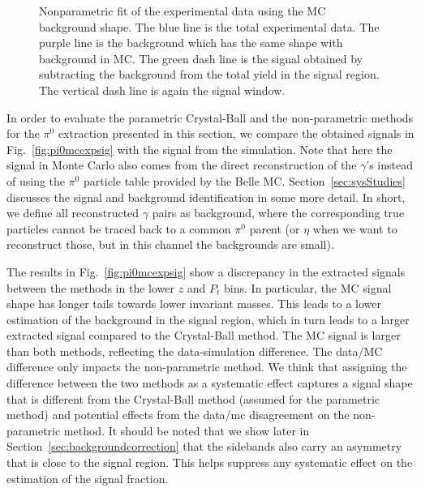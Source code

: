 \begin{figure}
  \caption[Nonparametric fit of the experimental data using the Monte Carlo background shape]{Nonparametric fit of the experimental data using the MC background shape. The blue line is the total experimental data. The purple line is the background which has the same shape with background in MC. The green dash line is the signal obtained by subtracting the background from the total yield in the signal region. The vertical dash line is again the signal window. }
  \label{fig:pi0_fit}
\end{figure}

In order to evaluate the parametric Crystal-Ball and the non-parametric methods for the $\pi^0$ extraction presented in this section, we compare the obtained signals in Fig.~\ref{fig:pi0mcexpsig} with the signal from the simulation. 
Note that here the signal in Monte Carlo also comes from the direct reconstruction of the $\gamma$'s instead of using the $\pi^0$ particle table provided by the Belle MC. Section~\ref{sec:sysStudies} discusses the signal and background identification in some more detail. In short, we define all reconstructed $\gamma$ pairs as background, where the corresponding true particles cannot be traced back to a common $\pi^0$ parent (or $\eta$ when we want to reconstruct those, but in this channel the backgrounds are small). 

The results in Fig.~\ref{fig:pi0mcexpsig} show a discrepancy in the extracted signals between the methods in the lower $z$ and $P_t$ bins. In particular, the MC signal shape has longer tails towards lower invariant masses. This leads to a lower estimation of the background in the signal region, which in turn leads to a larger extracted signal compared to the Crystal-Ball method. The MC signal is larger than both methods, reflecting the data-simulation difference. The data/MC difference only impacts the non-parametric method. We think that assigning the difference between the two methods as a systematic effect captures a signal shape that is different from the Crystal-Ball method (assumed for the parametric method) and potential effects from the data/mc disagreement on the non-parametric method. It should be noted that we show later in Section~\ref{sec:backgroundcorrection} that the sidebands also carry an asymmetry that is close to the signal region. This helps suppress any systematic effect on the estimation of the signal fraction.

